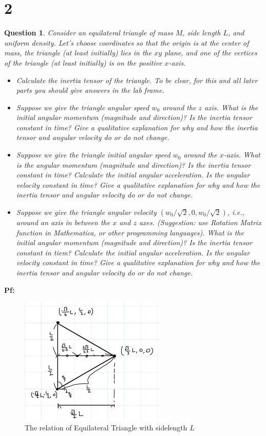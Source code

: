 \documentclass{article}
\newtheorem{question}{Question}
\begin{document}
\break

\section*{2}
\begin{question}\label{q2}
    Consider an equilateral triangle of mass $M$, side length $L$, and uniform density. Let's choose coordinates so that the origin is at the center of mass, the triangle (at least initially) lies in the $xy$ plane, and one of the vertices of the triangle (at least initially) is on the positive $x$-axis.
    \begin{itemize}
        \item[(a)] Calculate the inertia tensor of the triangle. To be clear, for this and all later parts you should give answers in the lab frame.
        \item[(b)] Suppose we give the triangle angular speed $w_0$ around the $z$ axis. What is the initial angular momentum (magnitude and direction)? Is the inertia tensor constant in time? Give a qualitative explanation for why and how the inertia tensor and angular velocity do or do not change.
        \item[(c)] Suppose we give the triangle initial angular speed $w_0$ around the $x$-axis. What is the angular momentum (magnitude and direction)? Is the inertia tensor constant in time? Calculate the initial angular acceleration. Is the angular velocity constant in time? Give a qualitative explanation for why and how the inertia tensor and angular velocity do or do not change.
        \item[(d)] Suppose we give the triangle angular velocity $(w_0/\sqrt{2},0,w_0/\sqrt{2})$, i.e., around an axis in between the $x$ and $z$ axes. (Suggestion: use Rotation Matrix function in Mathematica, or other programming languages). What is the initial angular momentum (magnitude and direction)? Is the inertia tensor constant in tiem? Calculate the initial angular acceleration. Is the angular velocity constant in time? Give a qualitative explanation for why and how the inertia tensor and angular velocity do or do not change. 
    \end{itemize}
\end{question}

\textbf{Pf:}

\begin{figure}[h!]
    \begin{center}
        \includegraphics[width=70mm]{phys103_q2.jpg}
        \caption{The relation of Equilateral Triangle with sidelength $L$}
    \end{center}
\end{figure}
\end{document}
